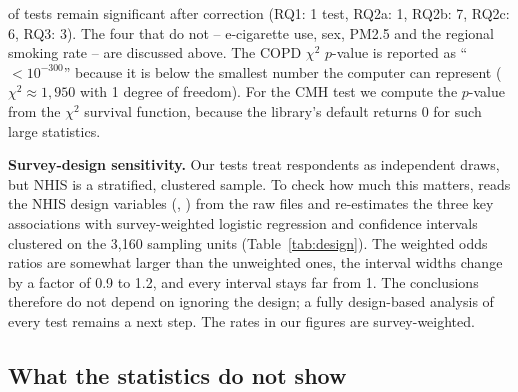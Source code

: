 \nSignificant of \nTests tests remain significant after correction (RQ1: 1 test, RQ2a: 1, RQ2b: 7, RQ2c: 6, RQ3: 3). The four that do not -- e-cigarette use, sex, PM2.5 and the regional smoking rate -- are discussed above. The COPD $\chi^2$ $p$-value is reported as ``$<10^{-300}$'' because it is below the smallest number the computer can represent ($\chi^2 \approx 1{,}950$ with 1 degree of freedom). For the CMH test we compute the $p$-value from the $\chi^2$ survival function, because the library's default returns 0 for such large statistics.

\textbf{Survey-design sensitivity.} Our tests treat respondents as independent draws, but NHIS is a stratified, clustered sample. To check how much this matters,  reads the NHIS design variables (, ) from the raw files and re-estimates the three key associations with survey-weighted logistic regression and confidence intervals clustered on the 3,160 sampling units (Table~\ref{tab:design}). The weighted odds ratios are somewhat larger than the unweighted ones, the interval widths change by a factor of 0.9 to 1.2, and every interval stays far from 1. The conclusions therefore do not depend on ignoring the design; a fully design-based analysis of every test remains a next step. The rates in our figures are survey-weighted.

\begin{table}[htbp]
\centering\small
\caption{Survey-design sensitivity: odds ratios from unweighted logistic regression (exact; the $2 \times 2$ tables elsewhere add 0.5 to each cell, e.g.\ 7.66 instead of 7.69 for smoking) and from survey-weighted logistic regression with confidence intervals clustered on the NHIS sampling units (year $\times$ stratum $\times$ PSU). Source: \texttt{design\_based\_odds\_ratios.csv}.}\label{tab:design}

\end{table}

\subsection{What the statistics do not show}\label{sec:notshow}

